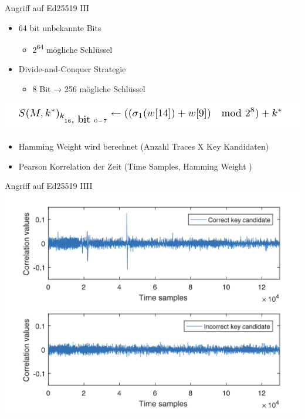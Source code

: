 \documentclass[
  10pt,
  ignorenonframetext,
  aspectratio=43,
]{beamer}
\providecommand{\tightlist}{%
  \setlength{\itemsep}{0pt}\setlength{\parskip}{0pt}}
\begin{document}
\begin{frame}{Angriff auf Ed25519 III}
\protect\hypertarget{angriff-auf-ed25519-iii}{}
\begin{itemize}
\tightlist
\item
  64 bit unbekannte Bits

  \begin{itemize}
  \tightlist
  \item
    2\textsuperscript{64} mögliche Schlüssel
  \end{itemize}
\item
  Divide-and-Conquer Strategie

  \begin{itemize}
  \tightlist
  \item
    8 Bit → 256 mögliche Schlüssel
  \end{itemize}
\end{itemize}

\includegraphics[width=\textwidth,height=0.6\textheight]{Abbildungen/keyDPA.png}

\begin{itemize}
\item
  Hamming Weight wird berechnet (Anzahl Traces X Key Kandidaten)
\item
  Pearson Korrelation der Zeit (Time Samples, Hamming Weight )
\end{itemize}
\end{frame}

\begin{frame}{Angriff auf Ed25519 IIII}
\protect\hypertarget{angriff-auf-ed25519-iiii}{}
\includegraphics[width=\textwidth,height=0.95\textheight]{Abbildungen/cvDPA.png}
\end{frame}
\end{document}
